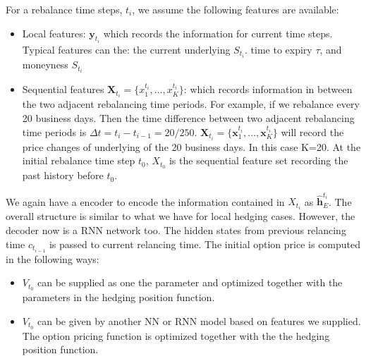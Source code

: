 \documentclass[letterpaper,12pt,titlepage,oneside,final]{book}
\numberwithin{equation}{section}
\theoremstyle{definition}
\newcommand{\vx}{\mathbf{x}}
\newcommand{\vy}{\mathbf{y}}
\begin{document}
For a rebalance time steps, $t_i$, we assume the following features are available:
\begin{itemize}
  \item Local features: $\vy_{t_i}$ which records the information for current time steps. Typical features can the: the current underlying $S_{t_i}$. time to expiry $\tau$, and  moneyness $S_{t_i}$
  \item Sequential features $\mathbf{X}_{t_i}=\{x^{t_i}_1,\dots,x^{t_i}_K \}$: which records information in between the two adjacent rebalancing time periods. For example, if we rebalance every 20 business days. Then the time difference between two adjacent rebalancing time periods is $\Delta t= t_i-t_{i-1}=20/250$. $\mathbf{X}_{t_i}=\{\vx^{t_i}_1,\dots,\vx^{t_i}_K \}$ will record the price changes of underlying of the 20 business days. In this case K=20. At the initial rebalance time step $t_0$, $X_{t_0}$ is the sequential feature set recording the past history before $t_0$.
\end{itemize}
We again have a encoder to encode the information contained in  $X_{t_i}$ as $\widehat{\mathbf{h}}_E^{t_i}$. The overall structure is similar to what we have for local hedging cases. However, the decoder now is a RNN network too. The hidden states from previous relancing time $c_{t_{i-1}}$ is passed to current relancing time. The initial option price is computed in the following ways:
\begin{itemize}
	\item  $V_{t_0}$ can be supplied as one the parameter and optimized together with the parameters in the hedging position function.
	\item $V_{t_0}$ can be given by another NN or RNN model based on features we supplied. The option pricing function is optimized together with the the hedging position function.
\end{itemize}
\end{document}

